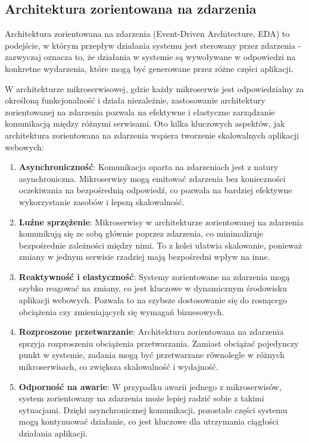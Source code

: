 \subsection{Architektura zorientowana na zdarzenia}

Architektura zorientowana na zdarzenia (Event-Driven Architecture, EDA) to podejście, w którym przepływ działania systemu jest sterowany przez zdarzenia - zazwyczaj oznacza to, że działania w systemie są wywoływane w odpowiedzi na konkretne wydarzenia, które mogą być generowane przez różne części aplikacji.

W architekturze mikroserwisowej, gdzie każdy mikroserwis jest odpowiedzialny za określoną funkcjonalność i działa niezależnie, zastosowanie architektury zorientowanej na zdarzenia pozwala na efektywne i elastyczne zarządzanie komunikacją między różnymi serwisami. Oto kilka kluczowych aspektów, jak architektura zorientowana na zdarzenia wspiera tworzenie skalowalnych aplikacji webowych:

\begin{enumerate}
    \item \textbf{Asynchroniczność}: Komunikacja oparta na zdarzeniach jest z natury asynchroniczna. Mikroserwisy mogą emitować zdarzenia bez konieczności oczekiwania na bezpośrednią odpowiedź, co pozwala na bardziej efektywne wykorzystanie zasobów i lepszą skalowalność.

    \item \textbf{Luźne sprzężenie}: Mikroserwisy w architekturze zorientowanej na zdarzenia komunikują się ze sobą głównie poprzez zdarzenia, co minimalizuje bezpośrednie zależności między nimi. To z kolei ułatwia skalowanie, ponieważ zmiany w jednym serwisie rzadziej mają bezpośredni wpływ na inne.

    \item \textbf{Reaktywność i elastyczność}: Systemy zorientowane na zdarzenia mogą szybko reagować na zmiany, co jest kluczowe w dynamicznym środowisku aplikacji webowych. Pozwala to na szybsze dostosowanie się do rosnącego obciążenia czy zmieniających się wymagań biznesowych.

    \item \textbf{Rozproszone przetwarzanie}: Architektura zorientowana na zdarzenia sprzyja rozproszeniu obciążenia przetwarzania. Zamiast obciążać pojedynczy punkt w systemie, zadania mogą być przetwarzane równolegle w różnych mikroserwisach, co zwiększa skalowalność i wydajność.

    \item \textbf{Odporność na awarie}: W przypadku awarii jednego z mikroserwisów, system zorientowany na zdarzenia może lepiej radzić sobie z takimi sytuacjami. Dzięki asynchronicznej komunikacji, pozostałe części systemu mogą kontynuować działanie, co jest kluczowe dla utrzymania ciągłości działania aplikacji.
\end{enumerate}

